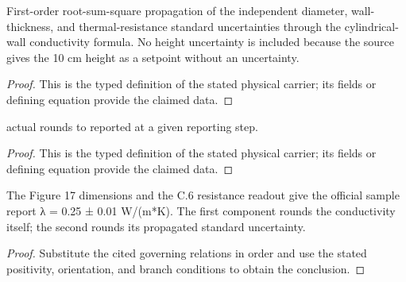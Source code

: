 \begin{definition}
  \label{def:physics:IPhO_2026_4_C_7:aux023}
  First-order root-sum-square propagation of the independent diameter, wall-thickness, and thermal-resistance standard uncertainties through the cylindrical-wall conductivity formula. No height uncertainty is included because the source gives the 10 cm height as a setpoint without an uncertainty.
\end{definition}
\begin{proof}
  This is the typed definition of the stated physical carrier; its fields or defining equation provide the claimed data.
\end{proof}

\begin{definition}
  \label{def:physics:IPhO_2026_4_C_7:aux024}
  actual rounds to reported at a given reporting step.
\end{definition}
\begin{proof}
  This is the typed definition of the stated physical carrier; its fields or defining equation provide the claimed data.
\end{proof}

\begin{lemma}
  \label{lem:physics:IPhO_2026_4_C_7:aux025}
  The Figure 17 dimensions and the C.6 resistance readout give the official sample report λ = 0.25 ± 0.01 W/(m*K). The first component rounds the conductivity itself; the second rounds its propagated standard uncertainty.
\end{lemma}
\begin{proof}
  Substitute the cited governing relations in order and use the stated positivity, orientation, and branch conditions to obtain the conclusion.
\end{proof}
